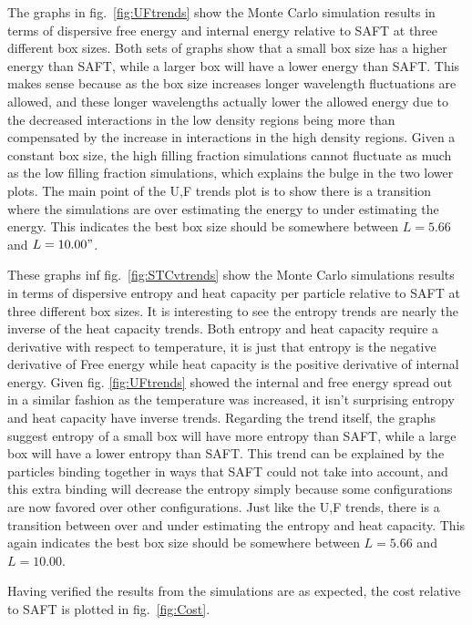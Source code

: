 The graphs in fig.~\ref{fig:UFtrends} show the Monte Carlo simulation results in terms of dispersive free energy and internal energy relative to SAFT at three different box sizes. Both sets of graphs show that a small box size has a higher energy than SAFT, while a larger box will have a lower energy than SAFT. This makes sense because as the box size increases longer wavelength fluctuations are allowed, and these longer wavelengths actually lower the allowed energy due to the decreased interactions in the low density regions being more than compensated by the increase in interactions in the high density regions. Given a constant box size, the high filling fraction simulations cannot fluctuate as much as the low filling fraction simulations, which explains the bulge in the two lower plots. The main point of the U,F trends plot is to show there is a transition where the simulations are over estimating the energy to under estimating the energy. This indicates the best box size should be somewhere between $L=5.66$ and $L=10.00"$.

These graphs inf fig.~\ref{fig:STCvtrends} show the Monte Carlo simulations results in terms of dispersive entropy and heat capacity per particle relative to SAFT at three different box sizes. It is interesting to see the entropy trends are nearly the inverse of the heat capacity trends. Both entropy and heat capacity require a derivative with respect to temperature, it is just that entropy is the negative derivative of Free energy while heat capacity is the positive derivative of internal energy. Given fig. \ref{fig:UFtrends} showed the internal and free energy spread out in a similar fashion as the temperature was increased, it isn't surprising entropy and heat capacity have inverse trends. Regarding the trend itself, the graphs suggest entropy of a small box will have more entropy than SAFT, while a large box will have a lower entropy than SAFT. This trend can be explained by the particles binding together in ways that SAFT could not take into account, and this extra binding will decrease the entropy simply because some configurations are now favored over other configurations. Just like the U,F trends, there is a transition between over and under estimating the entropy and heat capacity. This again indicates the best box size should be somewhere between $L=5.66$ and $L=10.00$.

Having verified the results from the simulations are as expected, the cost relative to SAFT is plotted in fig.~\ref{fig:Cost}. 
\pagebreak

